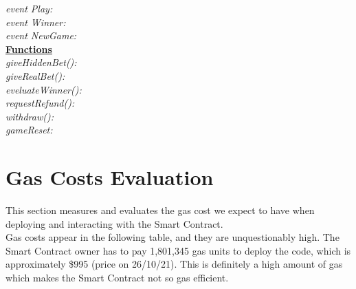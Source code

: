 \documentclass[12pt,a4paper]{article}
\begin{document}
\emph{event Play:} \\

\emph{event Winner:} \\

\emph{event NewGame:} \\

\textbf{\underline{Functions}} \\

\emph{giveHiddenBet():} \\

\emph{giveRealBet():} \\

\emph{eveluateWinner():} \\

\emph{requestRefund():} \\

\emph{withdraw():} \\

\emph{gameReset:} \\

\section*{Gas Costs Evaluation}
This section measures and evaluates the gas cost we expect to have when deploying and
interacting with the Smart Contract. \\

Gas costs appear in the following table, and they are unquestionably high.
The Smart Contract owner has to pay 1,801,345 gas units to deploy the code, which is
approximately \$995 (price on 26/10/21). This is definitely a high amount of gas which makes the
Smart Contract not so gas efficient. \\
\end{document}
